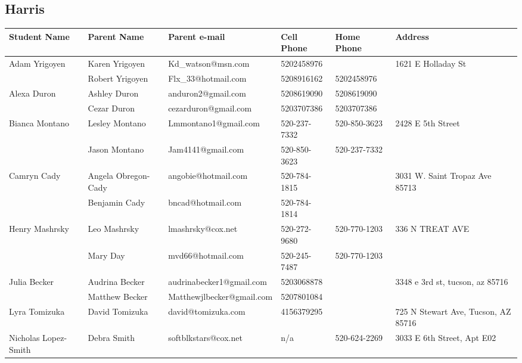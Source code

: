 \documentclass[landscape]{article}\usepackage[]{graphicx}\usepackage[]{color}
\begin{document}
\subsection{Harris}
\begin{longtable}{|p{100pt}|p{100pt}|p{140pt}|p{60pt}|p{64pt}|p{120pt}|}
\textbf{Student Name} & \textbf{Parent Name} & \textbf{Parent e-mail} & \textbf{Cell Phone} & \textbf{Home Phone} & \textbf{Address}\\
\hline
\hline
\multirow{2}{100pt}{Adam Yrigoyen} & Karen Yrigoyen  & Kd\_watson@msn.com & 5202458976 &  & \multirow{2}{120pt}{1621 E Holladay St} \\
 & Robert Yrigoyen & Flx\_33@hotmail.com  & 5208916162 & 5202458976 & \\
\hline
\multirow{2}{100pt}{Alexa Duron} & Ashley Duron & anduron2@gmail.com & 5208619090 & 5208619090 & \multirow{2}{120pt}{} \\
 & Cezar Duron & cezarduron@gmail.com & 5203707386 & 5203707386 & \\
\hline
\multirow{2}{100pt}{Bianca Montano} & Lesley Montano & Lmmontano1@gmail.com & 520-237-7332 & 520-850-3623 & \multirow{2}{120pt}{2428 E 5th Street} \\
 & Jason Montano & Jam4141@gmail.com & 520-850-3623 & 520-237-7332 & \\
\hline
\multirow{2}{100pt}{Camryn Cady} & Angela Obregon-Cady & angobie@hotmail.com & 520-784-1815 &  & \multirow{2}{120pt}{3031 W. Saint Tropaz Ave 85713} \\
 & Benjamin Cady & bncad@hotmail.com & 520-784-1814 &  & \\
\hline
\multirow{2}{100pt}{Henry Mashrsky} & Leo Mashrsky & lmashrsky@cox.net & 520-272-9680 & 520-770-1203 & \multirow{2}{120pt}{336 N TREAT AVE} \\
 & Mary Day & mvd66@hotmail.com & 520-245-7487 & 520-770-1203 & \\
\hline
\multirow{2}{100pt}{Julia Becker} & Audrina Becker & audrinabecker1@gmail.com & 5203068878 &  & \multirow{2}{120pt}{3348 e 3rd st, tucson, az 85716} \\
 & Matthew Becker & Matthewjlbecker@gmail.com & 5207801084 &  & \\
\hline
\multirow{2}{100pt}{Lyra Tomizuka} & David Tomizuka & david@tomizuka.com & 4156379295 &  & \multirow{2}{120pt}{725 N Stewart Ave, Tucson, AZ 85716} \\
 &  &  &  &  & \\
\hline
\multirow{2}{100pt}{Nicholas Lopez-Smith} & Debra Smith & softblkstars@cox.net & n/a & 520-624-2269 & \multirow{2}{120pt}{3033 E 6th Street, Apt E02} \\

\end{longtable}
\end{document}
